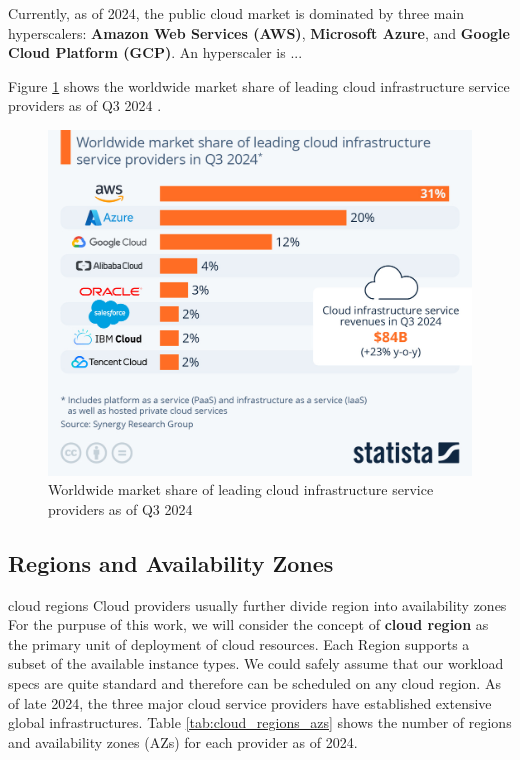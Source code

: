 


Currently, as of 2024, the public cloud market is dominated by three main hyperscalers: \textbf{Amazon Web Services (AWS)}, \textbf{Microsoft Azure}, and \textbf{Google Cloud Platform (GCP)}.
An hyperscaler is ...

Figure \ref{fig:pcp} shows the worldwide market share of leading cloud infrastructure service providers as of Q3 2024 \cite{statista}.

\begin{figure}[htbp]
    \centering
    \includegraphics[width=0.75\linewidth]{images/pcp.jpeg}
    \caption{Worldwide market share of leading cloud infrastructure service providers as of Q3 2024 \cite{statista}}
    \label{fig:pcp}
\end{figure}
  
\subsection{Regions and Availability Zones}

cloud regions
Cloud providers usually further divide region into availability zones
For the purpuse of this work, we will consider the concept of \textbf{cloud region} as the primary unit of deployment of cloud resources.
Each Region supports a subset of the available instance types.
We could safely assume that our workload specs are quite standard and therefore can be scheduled on any cloud region.
As of late 2024, the three major cloud service providers have established extensive global infrastructures.
Table \ref{tab:cloud_regions_azs} shows the number of regions and availability zones (AZs) for each provider as of 2024.

